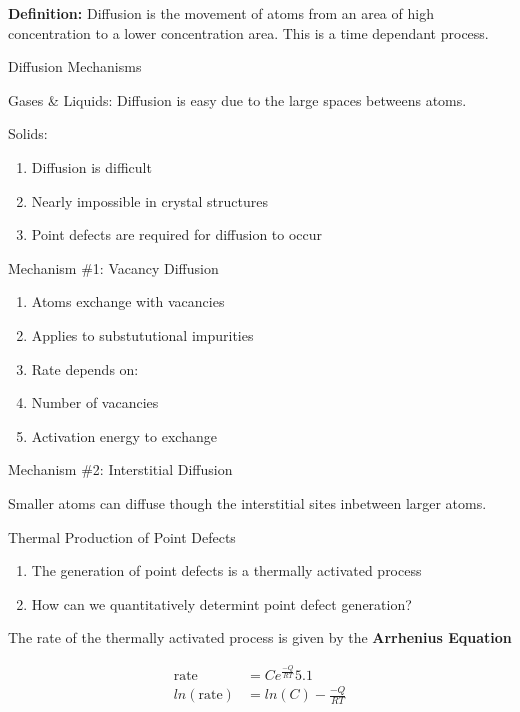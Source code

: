 \documentclass{article}
\begin{document}
\textbf{Definition:} Diffusion is the movement of atoms from an area of high concentration to a lower concentration area. This is a time dependant process.

\Large
Diffusion Mechanisms

\normalsize
Gases \& Liquids: Diffusion is easy due to the large spaces betweens atoms.

Solids:
\begin{enumerate}
    \item Diffusion is difficult
    \item Nearly impossible in crystal structures
    \item Point defects are required for diffusion to occur
\end{enumerate}

\Large
Mechanism \#1: Vacancy Diffusion

\normalsize
\begin{enumerate}
    \item Atoms exchange with vacancies
    \item Applies to substututional impurities
    \item Rate depends on: 
    \item Number of vacancies
    \item Activation energy to exchange
\end{enumerate}


\Large
Mechanism \#2: Interstitial Diffusion

\normalsize
Smaller atoms can diffuse though the interstitial sites inbetween larger atoms.

\Large
Thermal Production of Point Defects

\normalsize
\begin{enumerate}
    \item The generation of point defects is a thermally activated process
    \item How can we quantitatively determint point defect generation?
\end{enumerate}

The rate of the thermally activated process is given by the \textbf{Arrhenius Equation}

\begin{equation}
\begin{split}
\text{rate} &= C e^{\frac{-Q}{RT}} 5.1 \\
ln(\text{rate}) &= ln(C) - {\frac{-Q}{RT}}
\end{split}
\end{equation}
\end{document}
